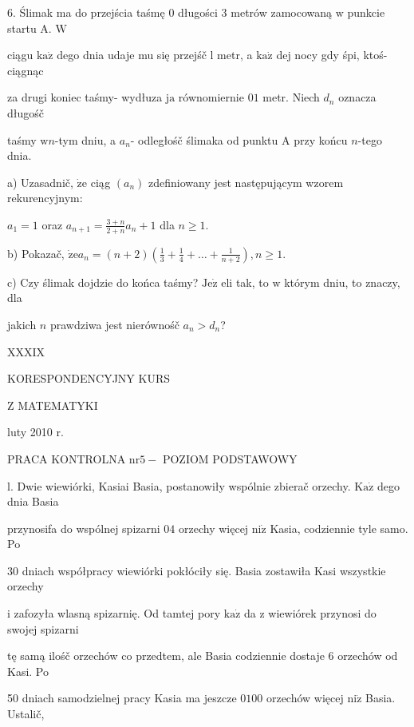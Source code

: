 \documentclass[a4paper,12pt]{article}
\begin{document}
6. Ślimak ma do przejścia taśmę $0$ długości 3 metrów zamocowaną $\mathrm{w}$ punkcie startu A. $\mathrm{W}$

ciągu $\mathrm{k}\mathrm{a}\dot{\mathrm{z}}$ dego dnia udaje mu się przejśč l metr, a $\mathrm{k}\mathrm{a}\dot{\mathrm{z}}$ dej nocy gdy śpi, ktoś- ciągnąc

za drugi koniec taśmy- wydłuza $\mathrm{j}\mathrm{a}$ równomiernie $0 1$ metr. Niech $d_{n}$ oznacza długośč

taśmy $\mathrm{w}n$-tym dniu, a $a_{n}$- odległośč ślimaka od punktu A przy końcu $n$-tego dnia.

a) Uzasadnič, $\dot{\mathrm{z}}\mathrm{e}$ ciąg $(a_{n})$ zdefiniowany jest następującym wzorem rekurencyjnym:

$a_{1}=1$ oraz $a_{n+1}=\displaystyle \frac{3+n}{2+n}a_{n}+1$ dla $n\geq 1.$

b) Pokazač, $\displaystyle \dot{\mathrm{z}}\mathrm{e}a_{n}=(n+2)(\frac{1}{3}+\frac{1}{4}+\ldots+\frac{1}{n+2}), n\geq 1.$

c) Czy ślimak dojdzie do końca taśmy? $\mathrm{J}\mathrm{e}\dot{\mathrm{z}}$ eli tak, to $\mathrm{w}$ którym dniu, to znaczy, dla

jakich $n$ prawdziwa jest nierównośč $a_{n}>d_{n}$?





XXXIX

KORESPONDENCYJNY KURS

Z MATEMATYKI

luty 2010 r.

PRACA KONTROLNA $\mathrm{n}\mathrm{r} 5-$ POZIOM PODSTAWOWY

l. Dwie wiewiórki, Kasiai Basia, postanowiły wspólnie zbierač orzechy. $\mathrm{K}\mathrm{a}\dot{\mathrm{z}}$ dego dnia Basia

przynosifa do wspólnej spizarni $04$ orzechy więcej $\mathrm{n}\mathrm{i}\dot{\mathrm{z}}$ Kasia, codziennie tyle samo. Po

30 dniach współpracy wiewiórki pokłóciły się. Basia zostawiła Kasi wszystkie orzechy

$\mathrm{i}$ zafozyła wlasną spizarnię. Od tamtej pory $\mathrm{k}\mathrm{a}\dot{\mathrm{z}}$ da $\mathrm{z}$ wiewiórek przynosi do swojej spizarni

tę samą ilośč orzechów co przedtem, ale Basia codziennie dostaje 6 orzechów od Kasi. Po

50 dniach samodzielnej pracy Kasia ma jeszcze $0100$ orzechów więcej $\mathrm{n}\mathrm{i}\dot{\mathrm{z}}$ Basia. Ustalič,
\end{document}

